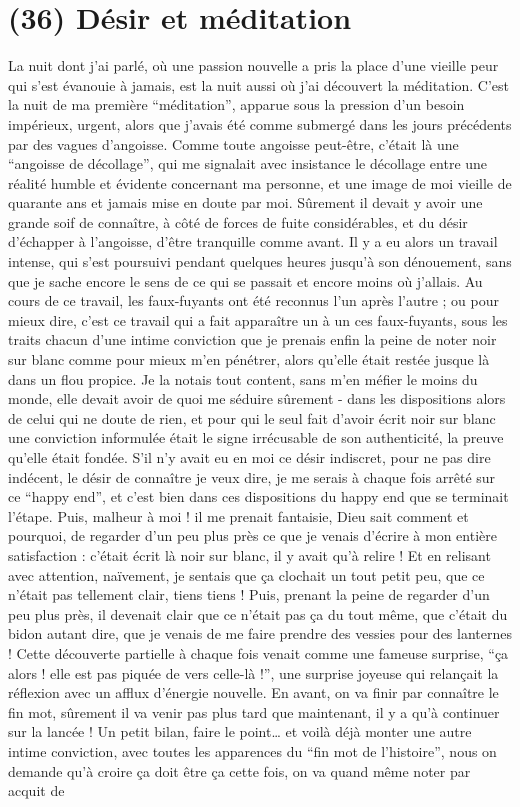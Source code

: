 \section{(36) Désir et méditation}

La nuit dont j'ai parlé, où une passion nouvelle a pris la place d'une vieille peur qui s'est évanouie à jamais, est la nuit aussi où j'ai découvert la méditation. C'est la nuit de ma première ``méditation'', apparue sous la pression d'un besoin impérieux, urgent, alors que j'avais été comme submergé dans les jours précédents par des vagues d'angoisse. Comme toute angoisse peut-être, c'était là une ``angoisse de décollage'', qui me signalait avec insistance le décollage entre une réalité humble et évidente concernant ma personne, et une image de moi vieille de quarante ans et jamais mise en doute par moi. Sûrement il devait y avoir une grande soif de connaître, à côté de forces de fuite considérables, et du désir d'échapper à l'angoisse, d'être tranquille comme avant. Il y a eu alors un travail intense, qui s'est poursuivi pendant quelques heures jusqu'à son dénouement, sans que je sache encore le sens de ce qui se passait et encore moins où j'allais. Au cours de ce travail, les faux-fuyants ont été reconnus l'un après l'autre ; ou pour mieux dire, c'est ce travail qui a fait apparaître un à un ces faux-fuyants, sous les traits chacun d'une intime conviction que je prenais enfin la peine de noter noir sur blanc comme pour mieux m'en pénétrer, alors qu'elle était restée jusque là dans un flou propice. Je la notais tout content, sans m'en méfier le moins du monde, elle devait avoir de quoi me séduire sûrement - dans les dispositions alors de celui qui ne doute de rien, et pour qui le seul fait d'avoir écrit noir sur blanc une conviction informulée était le signe irrécusable de son authenticité, la preuve qu'elle était fondée. S'il n'y avait eu en moi ce désir indiscret, pour ne pas dire indécent, le désir de connaître je veux dire, je me serais à chaque fois arrêté sur ce ``happy end'', et c'est bien dans ces dispositions du happy end que se terminait l'étape. Puis, malheur à moi ! il me prenait fantaisie, Dieu sait comment et pourquoi, de regarder d'un peu plus près ce que je venais d'écrire à mon entière satisfaction : c'était écrit là noir sur blanc, il y avait qu'à relire ! Et en relisant avec attention, naïvement, je sentais que ça clochait un tout petit peu, que ce n'était pas tellement clair, tiens tiens ! Puis, prenant la peine de regarder d'un peu plus près, il devenait clair que ce n'était pas ça du tout même, que c'était du bidon autant dire, que je venais de me faire prendre des vessies pour des lanternes ! Cette découverte partielle à chaque fois venait comme une fameuse surprise, ``ça alors ! elle est pas piquée de vers celle-là !'', une surprise joyeuse qui relançait la réflexion avec un afflux d'énergie nouvelle. En avant, on va finir par connaître le fin mot, sûrement il va venir pas plus tard que maintenant, il y a qu'à continuer sur la lancée ! Un petit bilan, faire le point\ldots{} et voilà déjà monter une autre intime conviction, avec toutes les apparences du ``fin mot de l'histoire'', nous on demande qu'à croire ça doit être ça cette fois, on va quand même noter par acquit de 